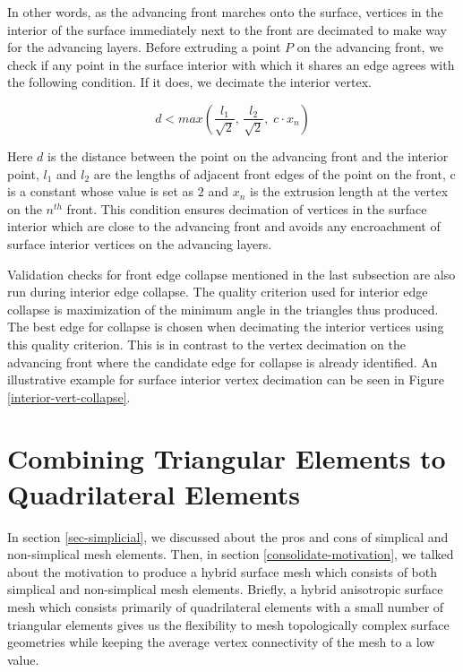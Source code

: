In other words, as the advancing front marches onto the surface, vertices in the interior of the surface immediately next to the front are decimated to make way for the advancing layers. Before extruding a point $P$ on the advancing front, we check if any point in the surface interior with which it shares an edge agrees with the following condition. If it does, we decimate the interior vertex.

\begin{equation}
    d < max \left( \frac{l_{1}}{\sqrt{2}}, \, \frac{l_{2}}{\sqrt{2}}, \; c \cdot  \mathit{x_n}\right)
    \label{collapse-eq}
\end{equation}

Here $d$ is the distance between the point on the advancing front and the interior point, $l_1$ and $l_2$ are the lengths of adjacent front edges of the point on the front, c is a constant whose value is set as $2$ and $x_n$ is the extrusion length at the vertex on the $n^{th}$ front. This condition ensures decimation of vertices in the surface interior which are close to the advancing front and avoids any encroachment of surface interior vertices on the advancing layers. 

Validation checks for front edge collapse mentioned in the last subsection are also run during interior edge collapse. The quality criterion used for interior edge collapse is maximization of the minimum angle in the triangles thus produced. The best edge for collapse is chosen when decimating the interior vertices using this quality criterion. This is in contrast to the vertex decimation on the advancing front where the candidate edge for collapse is already identified. An illustrative example for surface interior vertex decimation can be seen in Figure \ref{interior-vert-collapse}.

\section{Combining Triangular Elements to Quadrilateral Elements}

In section \ref{sec-simplicial}, we discussed about the pros and cons of simplical and non-simplical mesh elements. Then, in section \ref{consolidate-motivation}, we talked about the motivation to produce a hybrid surface mesh which consists of both simplical and non-simplical mesh elements. Briefly, a hybrid anisotropic surface mesh which consists primarily of quadrilateral elements with a small number of triangular elements gives us the flexibility to mesh topologically complex surface geometries while keeping the average vertex connectivity of the mesh to a low value.

